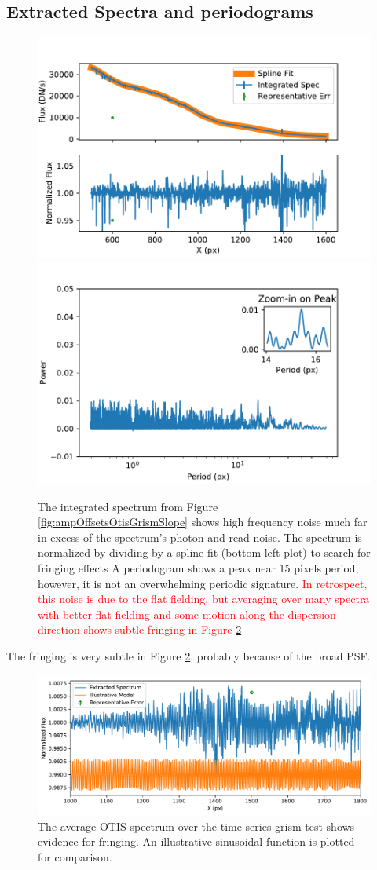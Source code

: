 \documentclass[]{aastex62}
\begin{document}
\subsection{Extracted Spectra and periodograms}


\begin{figure}[!hbtp]
\centering
\includegraphics[width=.49\columnwidth]{otis_spec_and_norm.pdf}
\includegraphics[width=.49\columnwidth]{otis_spec_periodogram.pdf}
\caption{The integrated spectrum from Figure \ref{fig:ampOffsetsOtisGrismSlope} shows high frequency noise much far in excess of the spectrum's photon and read noise.
The spectrum is normalized by dividing by a spline fit (bottom left plot) to search for fringing effects
A periodogram shows a peak near 15 pixels period, however, it is not an overwhelming periodic signature.
\textcolor{red}{In retrospect, this noise is due to the flat fielding, but averaging over many spectra with better flat fielding and some motion along the dispersion direction shows subtle fringing in Figure \ref{fig:avgOtisGrismSpecFringing}}
}\label{fig:integratedOtisGrismSpec}
\end{figure}

The fringing is very subtle in Figure \ref{fig:avgOtisGrismSpecFringing}, probably because of the broad PSF.

\begin{figure}[!hbtp]
\centering
\includegraphics[width=.99\columnwidth]{fringing_grism_otis.pdf}
\caption{The average OTIS spectrum over the time series grism test shows evidence for fringing.
An illustrative sinusoidal function is plotted for comparison.
}\label{fig:avgOtisGrismSpecFringing}
\end{figure}
\end{document}
